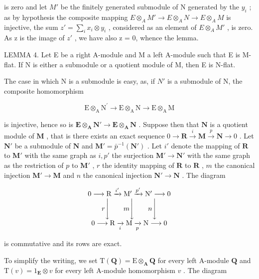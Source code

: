 is zero and let \(M'\) be the finitely generated submodule of N generated by the \(y_{i}\) ; as by hypothesis the composite mapping \(E \otimes_{A} M' \to E \otimes_{A} N \to E \otimes_{A} M\) is injective, the sum \(z' = \sum_{i} x_{i} \otimes y_{i}\) , considered as an element of \(E \otimes_{A} M'\) , is zero. As z is the image of \(z'\) , we have also z = 0, whence the lemma.

LEMMA 4. Let E be a right A-module and M a left A-module such that E is M-flat. If N is either a submodule or a quotient module of M, then E is N-flat.

The case in which N is a submodule is easy, as, if \(N'\) is a submodule of N, the composite homomorphism

\[
\mathrm{E} \otimes_ {\mathrm{A}} \mathrm{N} ^ {\prime} \rightarrow \mathrm{E} \otimes_ {\mathrm{A}} \mathrm{N} \rightarrow \mathrm{E} \otimes_ {\mathrm{A}} \mathrm{M}
\]

is injective, hence so is \(\mathbf{E} \otimes_{\mathbf{A}} \mathbf{N}' \to \mathbf{E} \otimes_{\mathbf{A}} \mathbf{N}\) . Suppose then that \(\mathbf{N}\) is a quotient module of \(\mathbf{M}\) , that is there exists an exact sequence \(0 \to \mathbf{R} \xrightarrow{i} \mathbf{M} \xrightarrow{p} \mathbf{N} \to 0\) . Let \(\mathbf{N}'\) be a submodule of \(\mathbf{N}\) and \(\mathbf{M}' = \bar{p}^{-1}(\mathbf{N}')\) . Let \(i'\) denote the mapping of \(\mathbf{R}\) to \(\mathbf{M}'\) with the same graph as \(i, p'\) the surjection \(\mathbf{M}' \to \mathbf{N}'\) with the same graph as the restriction of \(p\) to \(\mathbf{M}'\) , \(r\) the identity mapping of \(\mathbf{R}\) to \(\mathbf{R}\) , \(m\) the canonical injection \(\mathbf{M}' \to \mathbf{M}\) and \(n\) the canonical injection \(\mathbf{N}' \to \mathbf{N}\) . The diagram

\[
\begin{array}{c} 0 \longrightarrow \mathrm{R} \xrightarrow {i ^ {\prime}} \mathrm{M} ^ {\prime} \xrightarrow {p ^ {\prime}} \mathrm{N} ^ {\prime} \longrightarrow 0 \\ r \Biggl \downarrow \qquad m \Biggl \downarrow \qquad n \Biggl \downarrow \\ 0 \longrightarrow \mathrm{R} \xrightarrow [ i ]{} \mathrm{M} \xrightarrow [ p ]{} \mathrm{N} \longrightarrow 0 \end{array}
\]

is commutative and its rows are exact.

To simplify the writing, we set \(\mathrm{T}(\mathbf{Q}) = \mathrm{E} \otimes_{\mathbf{A}} \mathbf{Q}\) for every left A-module \(\mathbf{Q}\) and \(\mathrm{T}(v) = 1_{\mathbf{E}} \otimes v\) for every left A-module homomorphism \(v\) . The diagram

